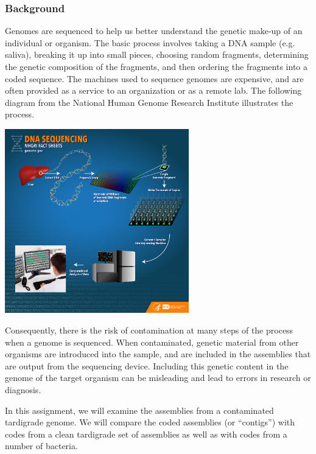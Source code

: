 \documentclass[11pt]{article}
\renewcommand\:{\colon} %
\begin{document}
\subsubsection*{Background}
Genomes are sequenced to help us better understand the genetic make-up of an individual or organism. The basic process involves taking a DNA sample (e.g. saliva), breaking it up into small pieces, choosing random fragments, determining the genetic composition of the fragments, and then ordering the fragments into a coded sequence. The machines used to sequence genomes are expensive, and are often provided as a service to an organization or as a remote lab. The following diagram from the National Human Genome Research Institute illustrates the process. \\

\begin{centering}
\includegraphics[width=0.6\textwidth]{dna_sequencing.jpg}
\end{centering}


Consequently, there is the risk of contamination at many steps of the process when a genome is sequenced. When contaminated, genetic material from other organisms are introduced into the sample,  and are included in the assemblies that are output from the sequencing device.  Including this genetic content in the genome of the target organism can be misleading and lead to errors in research or diagnosis.

In this assignment, we will examine the assemblies from a contaminated tardigrade genome. We will compare the coded assemblies (or ``contigs'') with codes from a clean tardigrade set of assemblies as well as with codes from a number of bacteria.
\end{document}
